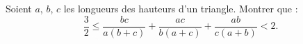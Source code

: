 Soient $a$, $b$, $c$ les longueurs des hauteurs d'un triangle. Montrer que :
\[
\frac{3}{2} \leq \frac{bc}{a(b+c)} + \frac{ac}{b(a+c)} + \frac{ab}{c(a+b)} < 2.
\]
